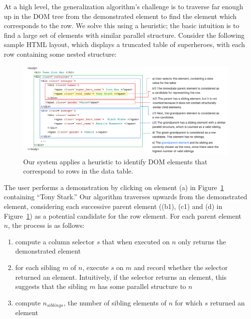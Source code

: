 \documentclass[sigconf,10pt]{acmart}
\providecommand{\tightlist}{%
  \setlength{\itemsep}{0pt}\setlength{\parskip}{0pt}}
\begin{document}
At a high level, the generalization algorithm's challenge is to traverse
far enough up in the DOM tree from the demonstrated element to find the
element which corresponds to the row. We solve this using a heuristic;
the basic intuition is to find a large set of elements with similar
parallel structure. Consider the following sample HTML layout, which
displays a truncated table of superheroes, with each row containing some
nested structure:

\begin{figure}
  \includegraphics[width=\textwidth]{media/algorithm.png}
  \caption{\label{fig:algorithm}Our system applies a heuristic to identify DOM elements that correspond to rows in the data table.}
\end{figure}

The user performs a demonstration by clicking on element (a) in
Figure~\ref{fig:algorithm} containing ``Tony Stark.'' Our algorithm
traverses upwards from the demonstrated element, considering each
successive parent element ((b1), (c1) and (d) in
Figure~\ref{fig:algorithm}) as a potential candidate for the row
element. For each parent element \(n\), the process is as follows:

\begin{enumerate}
\def\labelenumi{\arabic{enumi}.}
\tightlist
\item
  compute a column selector \(s\) that when executed on \(n\) only
  returns the demonstrated element
\item
  for each sibling \(m\) of \(n\), execute \(s\) on \(m\) and record
  whether the selector returned an element. Intuitively, if the selector
  returns an element, this suggests that the sibling \(m\) has some
  parallel structure to \(n\)
\item
  compute \(n_{siblings}\), the number of sibling elements of \(n\) for
  which \(s\) returned an element
\end{enumerate}
\end{document}
